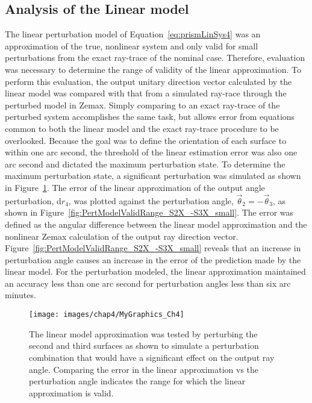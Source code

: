 \subsection{Analysis of the Linear model}
The linear perturbation model of Equation~\eqref{eq:prismLinSys4} was an approximation of the true, nonlinear system and only valid for small perturbations from the exact ray-trace of the nominal case. Therefore, evaluation was necessary to determine the range of validity of the linear approximation. To perform this evaluation, the output unitary direction vector calculated by the linear model was compared with that from a simulated ray-race through the perturbed model in Zemax. Simply comparing to an exact ray-trace of the perturbed system accomplishes the same task, but allows error from equations common to both the linear model and the exact ray-trace procedure to be overlooked. Because the goal was to define the orientation of each surface to within one arc second, the threshold of the linear estimation error was also one arc second and dictated the maximum perturbation state. To determine the maximum perturbation state, a significant perturbation was simulated as shown in Figure~\ref{fig:badPert}. The error of the linear approximation of the output angle perturbation, d$\hat{r}_4$, was plotted against the perturbation angle, $\vec{\theta}_2 = -\vec{\theta}_3$, as shown in Figure~\ref{fig:PertModelValidRange_S2X_-S3X_small}. The error was defined as the angular difference between the linear model approximation and the nonlinear Zemax calculation of the output ray direction vector. Figure~\ref{fig:PertModelValidRange_S2X_-S3X_small} reveals that an increase in perturbation angle causes an increase in the error of the prediction made by the linear model. For the perturbation modeled, the linear approximation maintained an accuracy less than one arc second for perturbation angles less than six arc minutes.

\begin{figure}[htb]		%
\centering
\texttt{[image: images/chap4/MyGraphics\_Ch4]}
\caption{The linear model approximation was tested by perturbing the second and third surfaces as shown to simulate a perturbation combination that would have a significant effect on the output ray angle. Comparing the error in the linear approximation vs the perturbation angle indicates the range for which the linear approximation is valid.}
\label{fig:badPert}
\end{figure}

